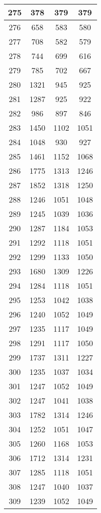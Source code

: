 \begin{table}[H]
\begin{tabular}{|c|c|c|c|}
\hline
275 & 378 & 379 & 379 \\
\hline
276 & 658 & 583 & 580 \\
\hline
277 & 708 & 582 & 579 \\
\hline
278 & 744 & 699 & 616 \\
\hline
279 & 785 & 702 & 667 \\
\hline
280 & 1321 & 945 & 925 \\
\hline
281 & 1287 & 925 & 922 \\
\hline
282 & 986 & 897 & 846 \\
\hline
283 & 1450 & 1102 & 1051 \\
\hline
284 & 1048 & 930 & 927 \\
\hline
285 & 1461 & 1152 & 1068 \\
\hline
286 & 1775 & 1313 & 1246 \\
\hline
287 & 1852 & 1318 & 1250 \\
\hline
288 & 1246 & 1051 & 1048 \\
\hline
289 & 1245 & 1039 & 1036 \\
\hline
290 & 1287 & 1184 & 1053 \\
\hline
291 & 1292 & 1118 & 1051 \\
\hline
292 & 1299 & 1133 & 1050 \\
\hline
293 & 1680 & 1309 & 1226 \\
\hline
294 & 1284 & 1118 & 1051 \\
\hline
295 & 1253 & 1042 & 1038 \\
\hline
296 & 1240 & 1052 & 1049 \\
\hline
297 & 1235 & 1117 & 1049 \\
\hline
298 & 1291 & 1117 & 1050 \\
\hline
299 & 1737 & 1311 & 1227 \\
\hline
300 & 1235 & 1037 & 1034 \\
\hline
301 & 1247 & 1052 & 1049 \\
\hline
302 & 1247 & 1041 & 1038 \\
\hline
303 & 1782 & 1314 & 1246 \\
\hline
304 & 1252 & 1051 & 1047 \\
\hline
305 & 1260 & 1168 & 1053 \\
\hline
306 & 1712 & 1314 & 1231 \\
\hline
307 & 1285 & 1118 & 1051 \\
\hline
308 & 1247 & 1040 & 1037 \\
\hline
309 & 1239 & 1052 & 1049 \\

\end{tabular}
\end{table}
